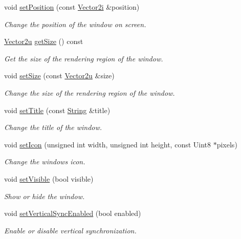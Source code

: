 \begin{DoxyCompactItemize}
void \hyperlink{classsf_1_1_window_a6c4078bfbf61c29bfc4b4732ce764f17}{set\+Position} (const \hyperlink{classsf_1_1_vector2}{Vector2i} \&position)
\begin{DoxyCompactList}\small\item\em Change the position of the window on screen. \end{DoxyCompactList}\item 
\hyperlink{classsf_1_1_vector2}{Vector2u} \hyperlink{classsf_1_1_window_a3969926741cbe83d7f9eeaf5333d4e71}{get\+Size} () const
\begin{DoxyCompactList}\small\item\em Get the size of the rendering region of the window. \end{DoxyCompactList}\item 
void \hyperlink{classsf_1_1_window_ab94ea32f22d15c0df11588e319de2546}{set\+Size} (const \hyperlink{classsf_1_1_vector2}{Vector2u} \&size)
\begin{DoxyCompactList}\small\item\em Change the size of the rendering region of the window. \end{DoxyCompactList}\item 
void \hyperlink{classsf_1_1_window_a3b3f3513bb6be90f5cd456c20b5fd5fa}{set\+Title} (const \hyperlink{classsf_1_1_string}{String} \&title)
\begin{DoxyCompactList}\small\item\em Change the title of the window. \end{DoxyCompactList}\item 
void \hyperlink{classsf_1_1_window_a63af61e026fba08e3153fd013620bcc0}{set\+Icon} (unsigned int width, unsigned int height, const Uint8 $\ast$pixels)
\begin{DoxyCompactList}\small\item\em Change the window\textquotesingle{}s icon. \end{DoxyCompactList}\item 
void \hyperlink{classsf_1_1_window_a160f7f11a207603d7e99ce606e749703}{set\+Visible} (bool visible)
\begin{DoxyCompactList}\small\item\em Show or hide the window. \end{DoxyCompactList}\item 
void \hyperlink{classsf_1_1_window_a59041c4556e0351048f8aff366034f61}{set\+Vertical\+Sync\+Enabled} (bool enabled)
\begin{DoxyCompactList}\small\item\em Enable or disable vertical synchronization. \end{DoxyCompactList}\item 

\end{DoxyCompactItemize}
